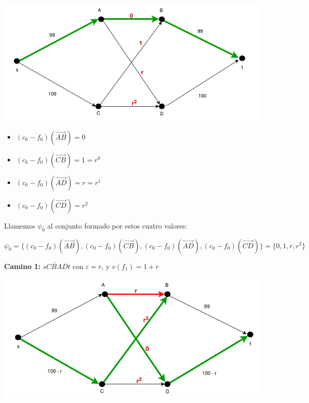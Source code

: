 \documentclass[10pt,a4paper]{article}
\begin{document}
    \begin{adjustbox}{max size={\textwidth}{\textheight}}
        \includegraphics{definitions/ff_problema_1b.png}
        \end{adjustbox}
    

\begin{itemize}

	\item $(c_0 - f_0) (\overrightarrow{AB}) = 0$
	\item $(c_0 - f_0) (\overrightarrow{CB}) = 1 = r^0$
	\item $(c_0 - f_0) (\overrightarrow{AD}) = r = r^1$
	\item $(c_0 - f_0) (\overrightarrow{CD}) = r^2$
\end{itemize}

Llamemos $\psi_0$ al conjunto formado por estos cuatro valores:

\begin{center}
$\psi_0 = \{ (c_0-f_0)(\overrightarrow{AB}), (c_0-f_0)(\overrightarrow{CB}), (c_0-f_0)(\overrightarrow{AD}), (c_0-f_0)(\overrightarrow{CD})\} = \{0, 1, r, r^2\}$
\end{center}

\textbf{Camino 1: }$sC\overleftarrow{BA}Dt$ con $\varepsilon = r$, y $v(f_1) = 1 + r$


    \begin{adjustbox}{max size={\textwidth}{\textheight}}
        \includegraphics{definitions/ff_problema_1c.png}
        \end{adjustbox}
    
\end{document}
